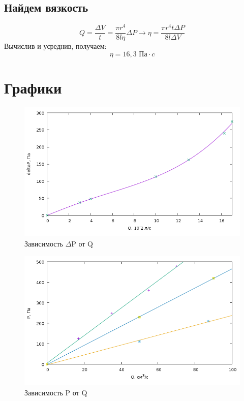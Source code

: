 \documentclass[a4paper]{article}
\begin{document}
	\subsection{Найдем вязкость}
	\begin{equation}
	Q=\frac{\Delta V}{t}=\frac{\pi r^4}{8l\eta}\Delta P \rightarrow \eta = \frac{\pi r^4t\Delta P}{8l\Delta V}
	\end{equation}
	Вычислив и усреднив, получаем:
	\begin{equation}
	\eta = 16,3 \text{ Па}\cdot c
	\end{equation}
	\section{Графики}
	\begin{figure}[ht!]
		\centering
		\includegraphics[width=125mm]{plot2.png}
		\caption{Зависимость $\Delta$P от Q\label{overflow}}
	\end{figure}
	\begin{figure}[ht!]
		\centering
		\includegraphics[width=125mm]{plot1.png}
		\caption{Зависимость P от Q\label{overflow}}
	\end{figure}
\end{document}
